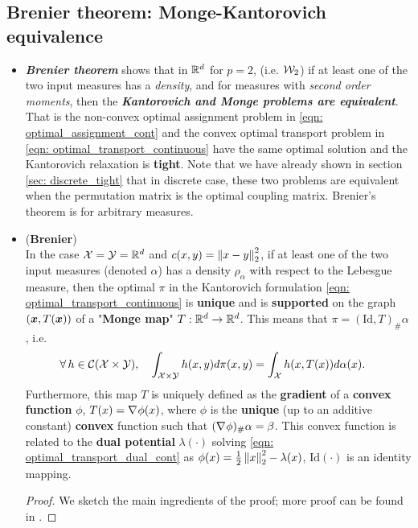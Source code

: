 \documentclass[11pt]{article}
\begin{document}
\subsection{Brenier theorem: Monge-Kantorovich equivalence}
\begin{itemize}
\item  \begin{remark}
\emph{\textbf{Brenier theorem}} shows that in ${\mathbb R}^d$ for $p = 2$, (i.e. ${\mathcal W}_{2}$) if at least one of the two input measures has a \emph{density}, and for measures with \emph{second order moments}, then the \emph{\textbf{Kantorovich and Monge problems are equivalent}}.  That is the non-convex optimal assignment problem in \eqref{eqn: optimal_assignment_cont} and the convex optimal transport problem in \eqref{eqn: optimal_transport_continuous} have the same optimal solution and the Kantorovich relaxation is \textbf{tight}. Note that we have already shown in section \ref{sec: discrete_tight} that in discrete case, these two problems are equivalent when the permutation matrix is the optimal coupling matrix. Brenier's theorem is for arbitrary measures.
\end{remark}

\item \begin{theorem} (\textbf{Brenier})\\ 
In the case ${\mathcal X} = {\mathcal Y} = {\mathbb R}^d$ and $c(x, y) = \left\|x -y\right\|_{2}^2$, if at least one of the two input measures (denoted $\alpha$) has a density $\rho_{\alpha}$ with respect to
the Lebesgue measure, then the optimal $\pi$ in the Kantorovich formulation \eqref{eqn: optimal_transport_continuous} is \textbf{unique} and is \textbf{supported} on the graph $(\boldsymbol{x}, T(\boldsymbol{x}))$ of a "\textbf{Monge map}" $T : {\mathbb R}^d \rightarrow {\mathbb R}^d$. This means that $\pi = (\text{Id}, T)_{\#}\alpha$, i.e. 
\begin{align}
\forall\, h\in {\mathcal C}({\mathcal X} \times {\mathcal Y}), \quad \int_{{\mathcal X} \times {\mathcal Y}} h (x, y) d\pi(x, y) &= \int_{{\mathcal X}} h(x, T(x)) d\alpha(x).  \label{eqn: Brenier_theorem}
\end{align} Furthermore, this map $T$ is uniquely defined as the \textbf{gradient} of a \textbf{convex function} $\phi$, $T(x) = \nabla_{}{\phi(x)}$, where $\phi$ is the \textbf{unique} (up to an additive constant) \textbf{convex} function such that $(\nabla_{}{\phi})_{\#}\alpha = \beta$. This convex function is related to the \textbf{dual potential} $\lambda(\cdot)$ solving \eqref{eqn: optimal_transport_dual_cont} as $\phi(x) = \frac{1}{2}\left\|x\right\|_{2}^2 - \lambda(x)$, $\text{Id}(\cdot)$ is an identity mapping.
\end{theorem}
\begin{proof}
We sketch the main ingredients of the proof; more proof can be found in \citep{santambrogio2015optimal, figalli2021invitation}.


\end{proof}
\end{itemize}
\end{document}
